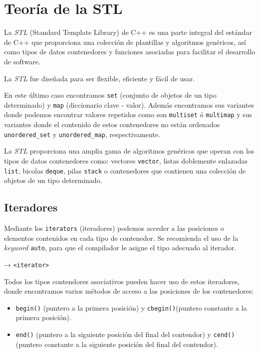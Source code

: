 \thispagestyle{empty}
\cleardoublepage
\chapter{Teoría de la STL}

La \textit{STL} (Standard Template Library) de C++ es una parte integral del estándar de C++ que proporciona una colección de plantillas y algoritmos genéricos, así como tipos de datos contenedores y funciones asociadas para facilitar el desarrollo de software.

La \textit{STL} fue diseñada para ser flexible, eficiente y fácil de usar.

En este último caso encontramos \texttt{set} (conjunto de objetos de un tipo determinado) y \texttt{map} (diccionario clave - valor).
Además encontramos sus variantes donde podemos encontrar valores repetidos como son \texttt{multiset} ó \texttt{multimap} y sus variantes donde el contenido de estos contenedores no están ordenados \texttt{unordered\_set} y \texttt{unordered\_map}, respectivamente.

La \textit{STL} proporciona una amplia gama de algoritmos genéricos que operan con los tipos de datos contenedores como: vectores \texttt{vector}, listas doblemente enlazadas \texttt{list},
bicolas \texttt{deque}, pilas \texttt{stack} o contenedores que contienen una colección de objetos de un tipo determinado.

\section{Iteradores}
Mediante los \texttt{iterators} (iteradores) podemos acceder a las posiciones o elementos contenidos en cada tipo de contenedor.
Se recomienda el uso de la \textit{keyword} \texttt{auto}, para que el compilador le asigne el tipo adecuado al iterador.

 → \texttt{<iterator>}

Todos los tipos contendores asociativos pueden hacer uso de estos iteradores, donde encontramos varios métodos de acceso a las posiciones 
de los contenedores:
\begin{itemize}
  \item \texttt{begin()} (puntero a la primera posición) y \texttt{cbegin()}(puntero constante a la primera posición).
  \item \texttt{end()} (puntero a la siguiente posición del final del contendor) y \texttt{cend()} (puntero constante a la siguiente posición del final del contendor).
\end{itemize}

